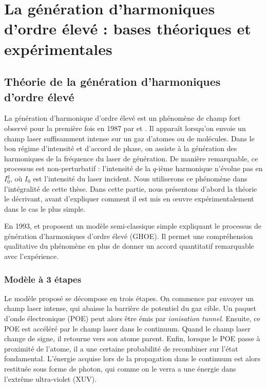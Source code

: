 \part{La génération d'harmoniques d'ordre élevé : bases théoriques et expérimentales}
\label{PA:GHOE}
\chapter{Théorie de la génération d'harmoniques d'ordre élevé}
La génération d'harmonique d'ordre élevé est un phénomène de champ fort observé pour la première fois en 1987 par  et . Il apparaît lorsqu'on envoie un champ laser suffisamment intense sur un gaz d'atomes ou de molécules. Dans le bon régime d'intensité et d'accord de phase, on assiste à la génération des harmoniques de la fréquence du laser de génération. De manière remarquable, ce processus est non-perturbatif : l'intensité de la $q$-ième harmonique n'évolue pas en $I_0^q$, où $I_0$ est l'intensité du laser incident. Nous utiliserons ce phénomène dans l'intégralité de cette thèse. Dans cette partie, nous présentons d'abord la théorie le décrivant, avant d'expliquer comment il est mis en œuvre expérimentalement dans le cas le plus simple.

En 1993,  et  proposent un modèle semi-classique simple expliquant le processus de génération d'harmoniques d'ordre élevé (GHOE). Il permet une compréhension qualitative du phénomène en plus de donner un accord quantitatif remarquable avec l'expérience.

\section{Modèle à 3 étapes}
\label{sec:threestep}
Le modèle proposé se décompose en trois étapes. On commence par envoyer un champ laser intense, qui abaisse la barrière de potentiel du gaz cible. Un paquet d'onde électronique (POE) peut alors être émis par \textit{ionisation tunnel}. Ensuite, ce POE est accéléré par le champ laser dans le continuum. Quand le champ laser change de signe, il retourne vers son atome parent. Enfin, lorsque le POE passe à proximité de l'atome, il a une certaine probabilité de recombiner sur l'état fondamental. L'énergie acquise lors de la propagation dans le continuum est alors restituée sous forme de photon, qui comme on le verra a une énergie dans l'extrême ultra-violet (XUV).

